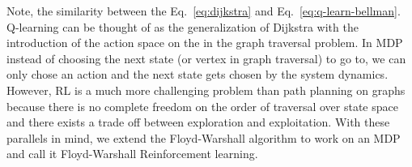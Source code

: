 Note, the similarity between the Eq.~\eqref{eq:dijkstra} and
Eq.~\eqref{eq:q-learn-bellman}. Q-learning can be thought of as the
generalization of Dijkstra with the introduction of the action space on the in
the graph traversal problem. In MDP instead of choosing the next state (or
vertex in graph traversal) to go to, we can only chose an action and the next
state gets chosen by the system dynamics.
However, RL is a much more challenging problem than path planning on graphs
because there is no complete freedom on the order of traversal over state space
and there exists a trade off between exploration and exploitation. With these
parallels in mind, we extend the Floyd-Warshall algorithm to work on an MDP and
call it Floyd-Warshall Reinforcement learning.

